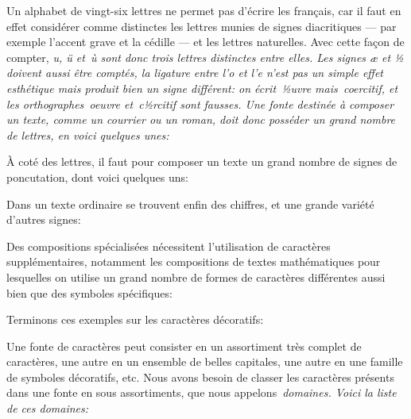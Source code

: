 Un alphabet de vingt-six lettres ne permet pas d'écrire les français,
car il faut en effet considérer comme distinctes les lettres munies de
signes diacritiques --- par exemple l'accent grave et la cédille ---
et les lettres naturelles. Avec cette façon de compter, \em{u, ü
\em{et}~ù} sont donc trois lettres distinctes entre elles. Les signes
\em{æ} et \em{½} doivent aussi être comptés, la ligature entre
l'\em{o} et l'\em{e} n'est pas un simple effet esthétique mais produit
bien un signe différent: on écrit~\em{½uvre} mais~\em{coercitif}, et
les orthographes~\em{oeuvre} et~\em{c½rcitif} sont fausses. Une fonte
destinée à composer un texte, comme un courrier ou un roman, doit donc
posséder un grand nombre de lettres, en voici quelques unes:


À coté des lettres, il faut pour composer un texte un grand nombre de
signes de poncutation, dont voici quelques uns:


Dans un texte ordinaire se trouvent enfin des chiffres, et une grande
variété d'autres signes:

\sampleline{%
\fontsample\rm 7\hfil
\fontsample\rm *\hfil
\fontsample\rm \dag\hfil
\fontsample\rm \P%
}

Des compositions spécialisées nécessitent l'utilisation de caractères
supplémentaires, notamment les compositions de textes mathématiques
pour lesquelles on utilise un grand nombre de formes de caractères
différentes aussi bien que des symboles spécifiques:

\sampleline{%
\fontsample\rm{$\int$}\hfil
\fontsample\rm{$\star$}\hfil
\fontsample\rm{$\otimes$}\hfil%
\fontsample\rm{$\coprod$}
}

Terminons ces exemples sur les caractères décoratifs:


Une fonte de caractères peut consister en un assortiment très complet
de caractères, une autre en un ensemble de belles capitales, une autre
en une famille de symboles décoratifs, etc. Nous avons besoin de
classer les caractères présents dans une fonte en sous assortiments,
que nous appelons~\em{domaines}. Voici la liste de ces domaines:


